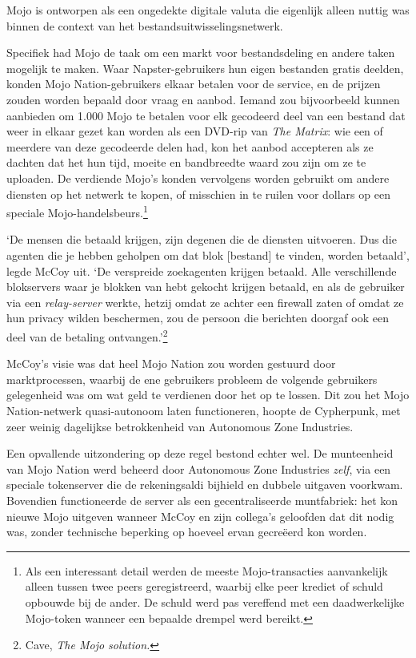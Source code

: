 \documentclass[
  a5paper,
  smalldemyvopaper,11pt,twoside,onecolumn,openright,extrafontsizes,
hidelinks]{memoir}
\begin{document}
Mojo is ontworpen als een ongedekte digitale valuta die eigenlijk alleen
nuttig was binnen de context van het bestandsuitwisselingsnetwerk.

Specifiek had Mojo de taak om een markt voor bestandsdeling en andere
taken mogelijk te maken. Waar Napster-gebruikers hun eigen bestanden
gratis deelden, konden Mojo Nation-gebruikers elkaar betalen voor de
service, en de prijzen zouden worden bepaald door vraag en aanbod.
Iemand zou bijvoorbeeld kunnen aanbieden om 1.000 Mojo te betalen voor
elk gecodeerd deel van een bestand dat weer in elkaar gezet kan worden
als een DVD-rip van \emph{The Matrix}: wie een of meerdere van deze
gecodeerde delen had, kon het aanbod accepteren als ze dachten dat het
hun tijd, moeite en bandbreedte waard zou zijn om ze te uploaden. De
verdiende Mojo's konden vervolgens worden gebruikt om andere diensten op
het netwerk te kopen, of misschien in te ruilen voor dollars op een
speciale Mojo-handelsbeurs.\footnote{Als een interessant detail werden
  de meeste Mojo-transacties aanvankelijk alleen tussen twee peers
  geregistreerd, waarbij elke peer krediet of schuld opbouwde bij de
  ander. De schuld werd pas vereffend met een daadwerkelijke Mojo-token
  wanneer een bepaalde drempel werd bereikt.}

`De mensen die betaald krijgen, zijn degenen die de diensten uitvoeren.
Dus die agenten die je hebben geholpen om dat blok {[}bestand{]} te
vinden, worden betaald', legde McCoy uit. `De verspreide zoekagenten
krijgen betaald. Alle verschillende blokservers waar je blokken van hebt
gekocht krijgen betaald, en als de gebruiker via een \emph{relay-server}
werkte, hetzij omdat ze achter een firewall zaten of omdat ze hun
privacy wilden beschermen, zou de persoon die berichten doorgaf ook een
deel van de betaling ontvangen.'\footnote{Cave, \emph{The Mojo
  solution.}}

McCoy's visie was dat heel Mojo Nation zou worden gestuurd door
marktprocessen, waarbij de ene gebruikers probleem de volgende
gebruikers gelegenheid was om wat geld te verdienen door het op te
lossen. Dit zou het Mojo Nation-netwerk quasi-autonoom laten
functioneren, hoopte de Cypherpunk, met zeer weinig dagelijkse
betrokkenheid van Autonomous Zone Industries.

Een opvallende uitzondering op deze regel bestond echter wel. De
munteenheid van Mojo Nation werd beheerd door Autonomous Zone Industries
\emph{zelf}, via een speciale tokenserver die de rekeningsaldi bijhield
en dubbele uitgaven voorkwam. Bovendien functioneerde de server als een
gecentraliseerde muntfabriek: het kon nieuwe Mojo uitgeven wanneer McCoy
en zijn collega's geloofden dat dit nodig was, zonder technische
beperking op hoeveel ervan gecreëerd kon worden.
\end{document}
